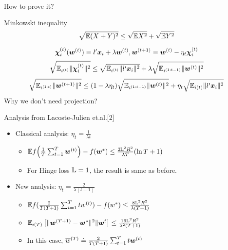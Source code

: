 \begin{frame}{How to prove it?}
    \begin{block}{ Minkowski inequality}
    \[
        \sqrt{\mathbb{E}(X+Y)^2} \le \sqrt{\mathbb{E} X^2} + \sqrt{\mathbb{E} Y^2}
    \]
    \end{block}
    \[
        \bm{\chi}_i^{(t)}(\bm{w}^{(t)}) = l'\bm{x}_i + \lambda \bm{w}^{(t)}, \bm{w}^{(t+1)} = \bm{w}^{(t)}-\eta_t\bm{\chi}_i
    ^{(t)}    
    \]
    \[
        \sqrt{\E_{i^{(t)}} \|\chiv_i^{(t)}\|^2} \le \sqrt{\E_{i^{(t)}} \| l'\xv_i \|^2} + \lambda           \sqrt{\E_{i^{(1:t-1)}} \| \wv^{(t)} \|^2} %
    \] 
    \[
        \sqrt{\mathbb{E}_{i^{(1:t)}} \|\bm{w}^{(t+1)}\|^2} \le (1-\lambda \eta_t) \sqrt{\mathbb{E}_{i^{(1:t-1)}} \|\bm{w}^{(t)}\|^2} +        \eta_t \sqrt{\mathbb{E}_{i(t)} \|l'\bm{x}_i\|^2} 
    \]
    {\color{blue} Why we don't need projection?}
\end{frame}

\begin{frame}{Analysis from Lacoste-Julien et.al.[2]}
    \begin{itemize} 
        \item Classical analysis: $\eta_t=\frac{1}{\lambda t}$
            \begin{itemize}
                \item $\mathbb{E} f\!\left(\frac1T\sum_{t=1}^T \bm{w}^{(t)} \right)- f(\bm{w}^*) \le \frac{2{\mathbb{L}}^2 R^2}{\lambda T}(\ln{T}+1)$
                \item For Hinge loss $\mathbb{L} = 1$, the result is same as before.
            \end{itemize}
        \item New analysis: $\eta_t=\frac{2}{\lambda (t+1)}$
            \begin{itemize}
                \item $\mathbb{E} f(\frac{2}{T(T+1)}\sum_{t=1}^{T}t w^{(t)}) - f(w^*) \le \frac{8{\mathbb{L}}^2 R^2}{\lambda (T+1)}$
                \item $\mathbb{E}_{i(T)} \left[  \|\bm{w}^{(T+1)} - \bm{w}^*\|^2  \|  \bm{w}^t  \right]  \le \frac{16{\mathbb{L}}^2 R^2}{\lambda^2 (T+1)}$
                \item In this case, $\overline{w}^{(T)}\doteq \frac{2}{T(T+1)}\sum_{t=1}^T t\bm{w}^{(t)}$
            \end{itemize}
    \end{itemize}
    
\end{frame}

